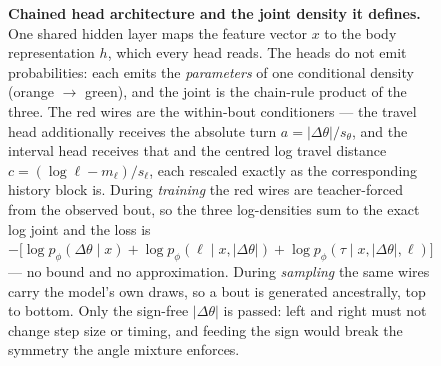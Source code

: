\begin{figure}[p]
{\begin{tikzpicture}
\end{tikzpicture}}
\caption{\textbf{Chained head architecture and the joint density it defines.}
One shared hidden layer maps the feature vector $x$ to the body representation $h$, which
every head reads. The heads do not emit probabilities: each emits the \emph{parameters} of
one conditional density (orange $\to$ green), and the joint is the chain-rule product of
the three. The red wires are the within-bout conditioners --- the travel head additionally
receives the absolute turn $a=|\Delta\theta|/s_\theta$, and the interval head receives that
and the centred log travel distance $c=(\log\ell-m_\ell)/s_\ell$, each rescaled exactly as
the corresponding history block is. During \emph{training} the red wires are teacher-forced
from the observed bout, so the three log-densities sum to the exact log joint and the loss
is $-\big[\log p_\phi(\Delta\theta\mid x)+\log p_\phi(\ell\mid x,|\Delta\theta|)
+\log p_\phi(\tau\mid x,|\Delta\theta|,\ell)\big]$ --- no bound and no approximation.
During \emph{sampling} the same wires carry the model's own draws, so a bout is generated
ancestrally, top to bottom. Only the sign-free $|\Delta\theta|$ is passed: left and right
must not change step size or timing, and feeding the sign would break the symmetry the
angle mixture enforces.}
\label{fig:architecture}
\end{figure}
